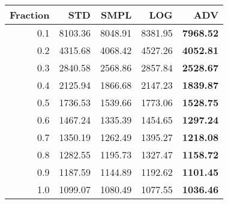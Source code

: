 \documentclass{standalone}
\begin{document}
\begin{tabular}{r|rrrr}
      \toprule
      Fraction & STD & SMPL & LOG & ADV\\
      \midrule
      0.1 & 8103.36 & 8048.91 & 8381.95 & \textbf{7968.52}\\
  0.2 & 4315.68 & 4068.42 & 4527.26 & \textbf{4052.81}\\
  0.3 & 2840.58 & 2568.86 & 2857.84 & \textbf{2528.67}\\
  0.4 & 2125.94 & 1866.68 & 2147.23 & \textbf{1839.87}\\
  0.5 & 1736.53 & 1539.66 & 1773.06 & \textbf{1528.75}\\
  0.6 & 1467.24 & 1335.39 & 1454.65 & \textbf{1297.24}\\
  0.7 & 1350.19 & 1262.49 & 1395.27 & \textbf{1218.08}\\
  0.8 & 1282.55 & 1195.73 & 1327.47 & \textbf{1158.72}\\
  0.9 & 1187.59 & 1144.89 & 1192.62 & \textbf{1101.45}\\
  1.0 & 1099.07 & 1080.49 & 1077.55 & \textbf{1036.46}\\
  \bottomrule
\end{tabular}
\end{document}
